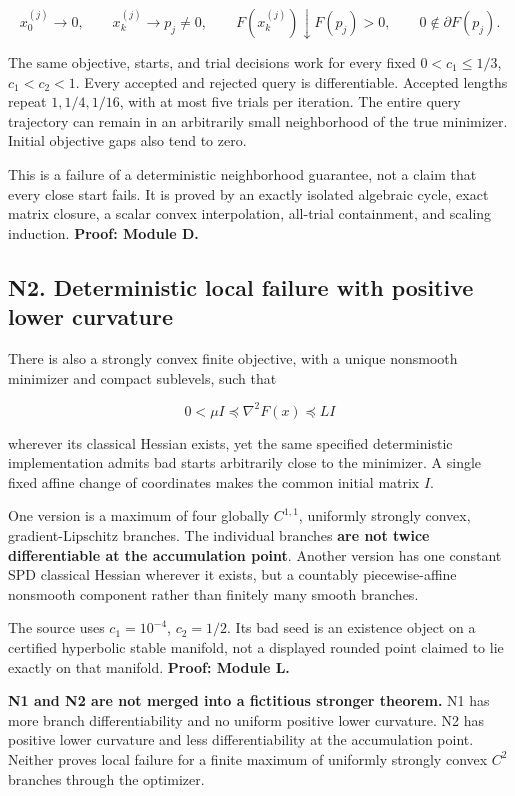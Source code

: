 \[
 x_0^{(j)}\to0,\qquad x_k^{(j)}\to p_j\ne0,\qquad
 F(x_k^{(j)})\downarrow F(p_j)>0,\qquad0\notin\partial F(p_j).
\]

The same objective, starts, and trial decisions work for every fixed \(0<c_1\le1/3\), \(c_1<c_2<1\). Every accepted and rejected query is differentiable. Accepted lengths repeat \(1,1/4,1/16\), with at most five trials per iteration. The entire query trajectory can remain in an arbitrarily small neighborhood of the true minimizer. Initial objective gaps also tend to zero.

This is a failure of a deterministic neighborhood guarantee, not a claim that every close start fails. It is proved by an exactly isolated algebraic cycle, exact matrix closure, a scalar convex interpolation, all-trial containment, and scaling induction. \textbf{Proof: Module D.}

\subsection{N2. Deterministic local failure with positive lower curvature}\label{n2.-deterministic-local-failure-with-positive-lower-curvature}

There is also a strongly convex finite objective, with a unique nonsmooth minimizer and compact sublevels, such that

\[
 0<\mu I\preceq\nabla^2F(x)\preceq LI
\]

wherever its classical Hessian exists, yet the same specified deterministic implementation admits bad starts arbitrarily close to the minimizer. A single fixed affine change of coordinates makes the common initial matrix \(I\).

One version is a maximum of four globally \(C^{1,1}\), uniformly strongly convex, gradient-Lipschitz branches. The individual branches \textbf{are not twice differentiable at the accumulation point}. Another version has one constant SPD classical Hessian wherever it exists, but a countably piecewise-affine nonsmooth component rather than finitely many smooth branches.

The source uses \(c_1=10^{-4}\), \(c_2=1/2\). Its bad seed is an existence object on a certified hyperbolic stable manifold, not a displayed rounded point claimed to lie exactly on that manifold. \textbf{Proof: Module L.}

\textbf{N1 and N2 are not merged into a fictitious stronger theorem.} N1 has more branch differentiability and no uniform positive lower curvature. N2 has positive lower curvature and less differentiability at the accumulation point. Neither proves local failure for a finite maximum of uniformly strongly convex \(C^2\) branches through the optimizer.

